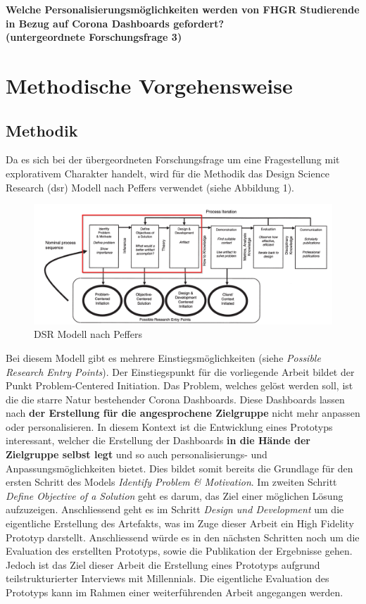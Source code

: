 \documentclass[12pt, oneside]{article}
\begin{document}
\begin{center}
\textbf{Welche Personalisierungsmöglichkeiten werden von FHGR Studierende in Bezug auf Corona Dashboards gefordert?\\
(untergeordnete Forschungsfrage 3)}
\end{center}

\clearpage
\section{Methodische Vorgehensweise}
\subsection{Methodik}
Da es sich bei der übergeordneten Forschungsfrage um eine Fragestellung mit explorativem Charakter handelt, wird für die Methodik das Design Science Research (\Gls{dsr}) Modell nach Peffers verwendet (siehe Abbildung 1).


\begin{figure}[ht]
	\includegraphics[width=12cm]{images/peffers_dsr_model.png}
	\centering
	\caption{DSR Modell nach Peffers ~\citep{K.Peffers.2007}}
\end{figure}

Bei diesem Modell gibt es mehrere Einstiegsmöglichkeiten (siehe \textit{Possible Research Entry Points}). Der Einstiegspunkt für die vorliegende Arbeit bildet der Punkt Problem-Centered Initiation. Das Problem, welches gelöst werden soll, ist die die starre Natur bestehender Corona Dashboards. Diese Dashboards lassen nach \textbf{der Erstellung für die angesprochene Zielgruppe} nicht mehr anpassen oder personalisieren. In diesem Kontext ist die Entwicklung eines Prototyps interessant, welcher die Erstellung der Dashboards \textbf{in die Hände der Zielgruppe selbst legt} und so auch personalisierungs- und Anpassungsmöglichkeiten bietet. Dies bildet somit bereits die Grundlage für den ersten Schritt des Models \textit{Identify Problem & Motivation}. Im zweiten Schritt \textit{Define Objective of a Solution} geht es darum, das Ziel einer möglichen Lösung aufzuzeigen. Anschliessend geht es im Schritt \textit{Design und Development} um die eigentliche Erstellung des Artefakts, was im Zuge dieser Arbeit ein High Fidelity Prototyp darstellt. Anschliessend würde es in den nächsten Schritten noch um die Evaluation des erstellten Prototyps, sowie die Publikation der Ergebnisse gehen. Jedoch ist das Ziel dieser Arbeit die Erstellung eines Prototyps aufgrund teilstrukturierter Interviews mit Millennials. Die eigentliche Evaluation des Prototyps kann im Rahmen einer weiterführenden Arbeit angegangen werden.
\end{document}
